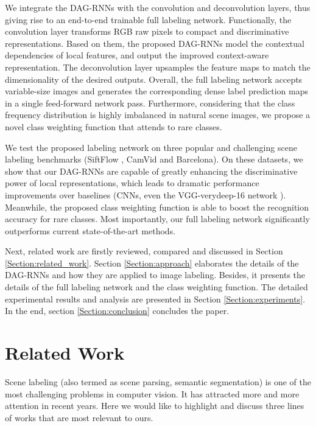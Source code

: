 \documentclass[10pt,twocolumn,letterpaper]{article}
\begin{document}
We integrate the DAG-RNNs with the convolution and deconvolution layers, thus giving rise to an end-to-end trainable full labeling network.
Functionally, the convolution layer transforms RGB raw pixels to compact and discriminative representations. Based on them, the proposed DAG-RNNs model the contextual dependencies of local features, and output the improved context-aware representation. The deconvolution layer upsamples the feature maps to match the dimensionality of the desired outputs. Overall, the full labeling network accepts variable-size images  and generates the corresponding dense label prediction maps in a single feed-forward network pass.
Furthermore, considering that the class frequency distribution is highly imbalanced in natural scene images, we propose a novel class weighting function that attends to rare classes.


We test the proposed labeling network on three popular and challenging scene labeling benchmarks (SiftFlow \cite{liu2009nonparametric}, CamVid \cite{BrostowSFC:ECCV08} and Barcelona\cite{tighe2010superparsing}). On these datasets,  we show that our DAG-RNNs are capable of greatly enhancing the discriminative power of local representations, which leads to dramatic performance improvements over baselines (CNNs, even the VGG-verydeep-16 network \cite{simonyan2014very}). Meanwhile, the proposed class weighting function is able to boost the recognition accuracy for rare classes.
Most importantly, our full labeling network significantly outperforms current state-of-the-art methods.

Next, related work are firstly reviewed, compared and discussed in Section \ref{Section:related_work}. Section \ref{Section:approach} elaborates the details of the DAG-RNNs and how they are applied to image labeling. Besides, it presents the details of the full labeling network and the class weighting function. The detailed experimental results and analysis are presented in Section \ref{Section:experiments}. In the end, section \ref{Section:conclusion} concludes the paper.

\section{Related Work}
Scene labeling (also termed as scene parsing, semantic segmentation) is one of the most challenging problems in computer vision. It has attracted more and more attention in recent years. Here we would like to highlight and discuss three lines of works that are most relevant to ours.
\end{document}
